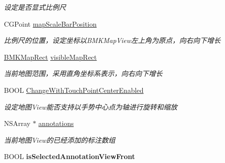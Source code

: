 \begin{DoxyCompactItemize}
\begin{DoxyCompactList}\small\item\em 设定是否显式比例尺 \end{DoxyCompactList}\item 
\hypertarget{interface_b_m_k_map_view_a5eeee2f88682636f7e6f891246b03730}{C\+G\+Point \hyperlink{interface_b_m_k_map_view_a5eeee2f88682636f7e6f891246b03730}{map\+Scale\+Bar\+Position}}\label{interface_b_m_k_map_view_a5eeee2f88682636f7e6f891246b03730}

\begin{DoxyCompactList}\small\item\em 比例尺的位置，设定坐标以\+B\+M\+K\+Map\+View左上角为原点，向右向下增长 \end{DoxyCompactList}\item 
\hypertarget{interface_b_m_k_map_view_a35576ab39592ef50d1190c2b672c0923}{\hyperlink{struct_b_m_k_map_rect}{B\+M\+K\+Map\+Rect} \hyperlink{interface_b_m_k_map_view_a35576ab39592ef50d1190c2b672c0923}{visible\+Map\+Rect}}\label{interface_b_m_k_map_view_a35576ab39592ef50d1190c2b672c0923}

\begin{DoxyCompactList}\small\item\em 当前地图范围，采用直角坐标系表示，向右向下增长 \end{DoxyCompactList}\item 
\hypertarget{interface_b_m_k_map_view_aa1868ea167edc68fe4b15ad982968ade}{B\+O\+O\+L \hyperlink{interface_b_m_k_map_view_aa1868ea167edc68fe4b15ad982968ade}{Change\+With\+Touch\+Point\+Center\+Enabled}}\label{interface_b_m_k_map_view_aa1868ea167edc68fe4b15ad982968ade}

\begin{DoxyCompactList}\small\item\em 设定地图\+View能否支持以手势中心点为轴进行旋转和缩放 \end{DoxyCompactList}\item 
\hypertarget{interface_b_m_k_map_view_a61bc5de820abcf06bf3792c933f3e618}{N\+S\+Array $\ast$ \hyperlink{interface_b_m_k_map_view_a61bc5de820abcf06bf3792c933f3e618}{annotations}}\label{interface_b_m_k_map_view_a61bc5de820abcf06bf3792c933f3e618}

\begin{DoxyCompactList}\small\item\em 当前地图\+View的已经添加的标注数组 \end{DoxyCompactList}\item 
\hypertarget{interface_b_m_k_map_view_a5907ada55d984353e2af6c510a334810}{B\+O\+O\+L {\bfseries is\+Selected\+Annotation\+View\+Front}}\label{interface_b_m_k_map_view_a5907ada55d984353e2af6c510a334810}


\end{DoxyCompactItemize}
